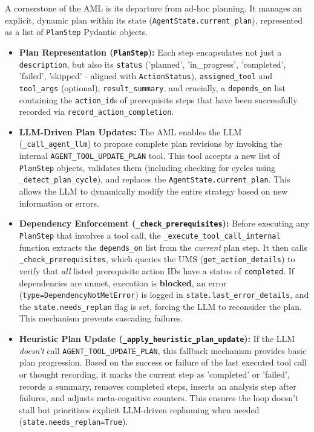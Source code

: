 \documentclass[12pt,a4paper]{article}
\newcommand{\code}[1]{\nolinkurl{#1}}
\begin{document}
A cornerstone of the AML is its departure from ad-hoc planning. It manages an explicit, dynamic plan within its state (\code{AgentState.current\_plan}), represented as a list of \code{PlanStep} Pydantic objects.

\begin{itemize}
    \item \textbf{Plan Representation (\code{PlanStep}):} Each step encapsulates not just a \code{description}, but also its \code{status} ('planned', 'in\_progress', 'completed', 'failed', 'skipped' - aligned with \code{ActionStatus}), \code{assigned\_tool} and \code{tool\_args} (optional), \code{result\_summary}, and crucially, a \code{depends\_on} list containing the \code{action\_id}s of prerequisite steps that have been successfully recorded via \code{record\_action\_completion}.

    \item \textbf{LLM-Driven Plan Updates:} The AML enables the LLM (\code{\_call\_agent\_llm}) to propose complete plan revisions by invoking the internal \code{AGENT\_TOOL\_UPDATE\_PLAN} tool. This tool accepts a new list of \code{PlanStep} objects, validates them (including checking for cycles using \code{\_detect\_plan\_cycle}), and replaces the \code{AgentState.current\_plan}. This allows the LLM to dynamically modify the entire strategy based on new information or errors.

    \item \textbf{Dependency Enforcement (\code{\_check\_prerequisites}):} Before executing any \code{PlanStep} that involves a tool call, the \code{\_execute\_tool\_call\_internal} function extracts the \code{depends\_on} list from the \textit{current} plan step. It then calls \code{\_check\_prerequisites}, which queries the UMS (\code{get\_action\_details}) to verify that \textit{all} listed prerequisite action IDs have a status of \code{completed}. If dependencies are unmet, execution is \textbf{blocked}, an error (\code{type=DependencyNotMetError}) is logged in \code{state.last\_error\_details}, and the \code{state.needs\_replan} flag is set, forcing the LLM to reconsider the plan. This mechanism prevents cascading failures.

    \item \textbf{Heuristic Plan Update (\code{\_apply\_heuristic\_plan\_update}):} If the LLM \textit{doesn't} call \code{AGENT\_TOOL\_UPDATE\_PLAN}, this fallback mechanism provides basic plan progression. Based on the success or failure of the last executed tool call or thought recording, it marks the current step as 'completed' or 'failed', records a summary, removes completed steps, inserts an analysis step after failures, and adjusts meta-cognitive counters. This ensures the loop doesn't stall but prioritizes explicit LLM-driven replanning when needed (\code{state.needs\_replan=True}).
\end{itemize}
\end{document}
